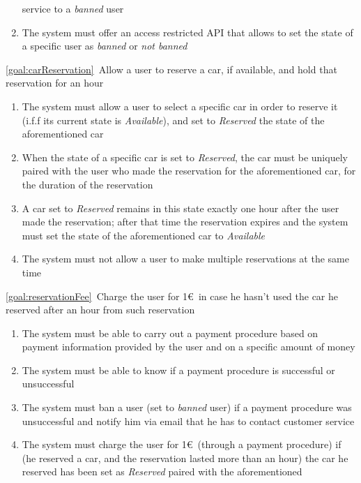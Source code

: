 \begin{description}
\begin{enumerate}[resume*]
   				service to a \emph{banned} user
   				\item The system must offer an access restricted API that allows to set the state of a
   				specific user as \emph{banned} or \emph{not banned}
   			\end{enumerate}
 	  	\item \ref{goal:carReservation}\ Allow a user to reserve a car, if available, and hold that
 	  	reservation for an hour
 	  		\begin{enumerate}[resume*]
 	  			\item The system must allow a user to select a specific car in order to reserve it 
 	  			(i.f.f its current state is \emph{Available}), and set to \emph{Reserved} the state of
 	  			the aforementioned car
 	  			\item When the state of a specific car is set to \emph{Reserved}, the car must be
 	  			uniquely paired with the user who made the reservation for the aforementioned car, for
 	  			the duration of the reservation
 	  			\item A car set to \emph{Reserved} remains in this state exactly one hour after the user
 	  			made the reservation; after that time the reservation expires and the system
 	  			must set the state of the aforementioned car to \emph{Available}
 	  			\item The system must not allow a user to make multiple reservations at the same time
   			\end{enumerate}
  		\item \ref{goal:reservationFee}\ Charge the user for 1\euro\ in case he hasn't used the car he reserved after an hour from such reservation
  			\begin{enumerate}[resume*]
  				\item The system must be able to carry out a payment procedure based on payment
  				information provided by the user and on a specific amount of money
  				\item The system must be able to know if a payment procedure is successful or
  				unsuccessful
  				\item The system must ban a user (set to \emph{banned} user) if a
  				payment procedure was unsuccessful and notify him via email that he has to
  				contact customer service
  				\item The system must charge the user for 1\euro\ (through a payment procedure) if
  				(he reserved a car, and the reservation lasted more than an hour)
  				the car he reserved has been set as \emph{Reserved} paired with the aforementioned

\end{enumerate}
\end{description}
